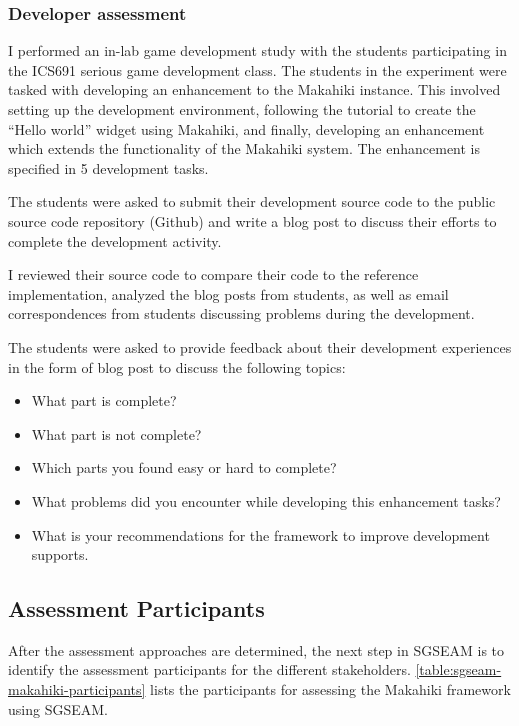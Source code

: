 \subsubsection{Developer assessment}

I performed an in-lab game development study with the students participating in the ICS691 serious game development class. The students in the experiment were tasked with developing an enhancement to the Makahiki instance. This involved setting up the development environment, following the tutorial to create the ``Hello world'' widget using Makahiki, and finally, developing an enhancement which extends the functionality of the Makahiki system. The enhancement is specified in 5 development tasks. 

The students were asked to submit their development source code to the public source code repository (Github) and write a blog post to discuss their efforts to complete the development activity.

I reviewed their source code to compare their code to the reference implementation, analyzed the blog posts from students, as well as email correspondences from students discussing problems during the development.

The students were asked to provide feedback about their development experiences in the form of blog post to discuss the following topics:
\begin{itemize}
\item What part is complete?
\item What part is not complete?
\item Which parts you found easy or hard to complete?
\item What problems did you encounter while developing this enhancement tasks?
\item What is your recommendations for the framework to improve development supports.
\end{itemize}

\subsection{Assessment Participants}

After the assessment approaches are determined, the next step in SGSEAM is to identify the assessment participants for the different stakeholders. \autoref{table:sgseam-makahiki-participants} lists the participants for assessing the Makahiki framework using SGSEAM. 

